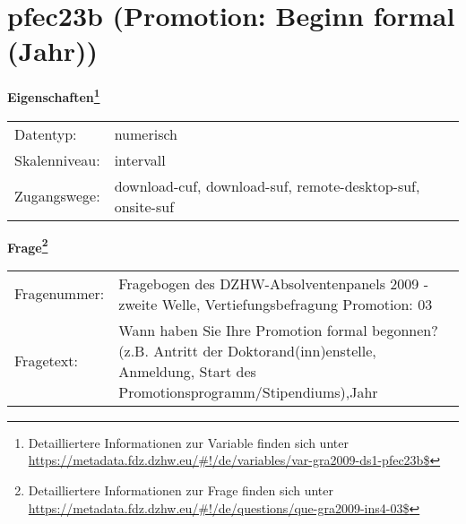 
    \setcounter{footnote}{0}

    \vspace*{-1.8cm}
	\section{pfec23b (Promotion: Beginn formal (Jahr))}
	\label{section:pfec23b}



    \vspace*{0.5cm}
    \noindent\textbf{Eigenschaften\footnote{Detailliertere Informationen zur Variable finden sich unter
		\url{https://metadata.fdz.dzhw.eu/\#!/de/variables/var-gra2009-ds1-pfec23b$}}}\\
	\begin{tabularx}{\hsize}{@{}lX}
	Datentyp: & numerisch \\
	Skalenniveau: & intervall \\
	Zugangswege: &
	  download-cuf, 
	  download-suf, 
	  remote-desktop-suf, 
	  onsite-suf
 \\
    \end{tabularx}



				\vspace*{0.5cm}
                \noindent\textbf{Frage\footnote{Detailliertere Informationen zur Frage finden sich unter
		              \url{https://metadata.fdz.dzhw.eu/\#!/de/questions/que-gra2009-ins4-03$}}}\\
				\begin{tabularx}{\hsize}{@{}lX}
					Fragenummer: &
					  Fragebogen des DZHW-Absolventenpanels 2009 - zweite Welle, Vertiefungsbefragung Promotion:
					  03
 \\
					Fragetext: & Wann haben Sie Ihre Promotion formal begonnen? (z.B. Antritt der Doktorand(inn)enstelle, Anmeldung, Start des Promotionsprogramm/Stipendiums),Jahr \\
				\end{tabularx}





